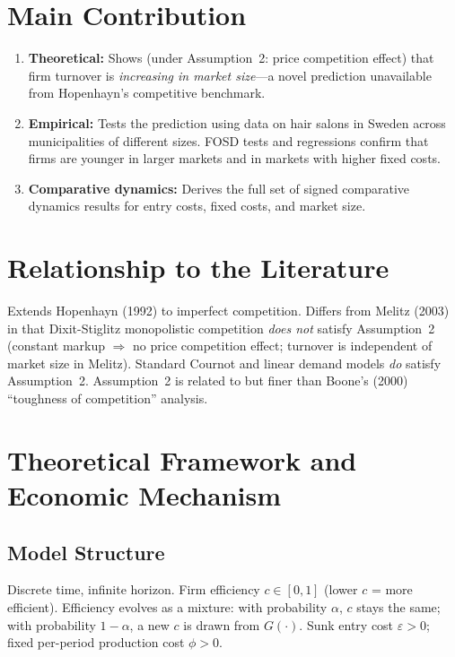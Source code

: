 \section{Main Contribution}

\begin{enumerate}
  \item \textbf{Theoretical:} Shows (under Assumption~2: price competition
    effect) that firm turnover is \emph{increasing in market size}---a novel
    prediction unavailable from Hopenhayn's competitive benchmark.
  \item \textbf{Empirical:} Tests the prediction using data on hair salons in
    Sweden across municipalities of different sizes. FOSD tests and regressions
    confirm that firms are younger in larger markets and in markets with higher
    fixed costs.
  \item \textbf{Comparative dynamics:} Derives the full set of signed
    comparative dynamics results for entry costs, fixed costs, and market size.
\end{enumerate}

\section{Relationship to the Literature}

Extends Hopenhayn (1992) to imperfect competition. Differs from Melitz (2003)
in that Dixit-Stiglitz monopolistic competition \emph{does not} satisfy
Assumption~2 (constant markup $\Rightarrow$ no price competition effect;
turnover is independent of market size in Melitz). Standard Cournot and linear
demand models \emph{do} satisfy Assumption~2. Assumption~2 is related to but
finer than Boone's (2000) ``toughness of competition'' analysis.

\section{Theoretical Framework and Economic Mechanism}

\subsection*{Model Structure}

Discrete time, infinite horizon. Firm efficiency $c\in[0,1]$ (lower $c$ =
more efficient). Efficiency evolves as a mixture: with probability $\alpha$,
$c$ stays the same; with probability $1-\alpha$, a new $c$ is drawn from $G(\cdot)$.
Sunk entry cost $\varepsilon>0$; fixed per-period production cost $\phi>0$.

